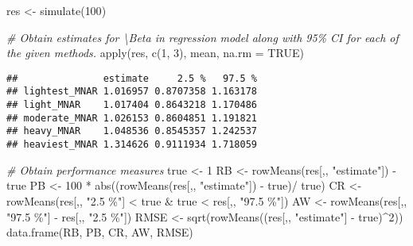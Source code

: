 \documentclass[
]{article}
\newenvironment{Shaded}{\begin{snugshade}}{\end{snugshade}}
\newcommand{\AttributeTok}[1]{\textcolor[rgb]{0.77,0.63,0.00}{#1}}
\newcommand{\CommentTok}[1]{\textcolor[rgb]{0.56,0.35,0.01}{\textit{#1}}}
\newcommand{\ConstantTok}[1]{\textcolor[rgb]{0.00,0.00,0.00}{#1}}
\newcommand{\DecValTok}[1]{\textcolor[rgb]{0.00,0.00,0.81}{#1}}
\newcommand{\FunctionTok}[1]{\textcolor[rgb]{0.00,0.00,0.00}{#1}}
\newcommand{\NormalTok}[1]{#1}
\newcommand{\OtherTok}[1]{\textcolor[rgb]{0.56,0.35,0.01}{#1}}
\newcommand{\SpecialCharTok}[1]{\textcolor[rgb]{0.00,0.00,0.00}{#1}}
\newcommand{\StringTok}[1]{\textcolor[rgb]{0.31,0.60,0.02}{#1}}
\begin{document}
\begin{Shaded}
\begin{Highlighting}[]
\NormalTok{res }\OtherTok{\textless{}{-}} \FunctionTok{simulate}\NormalTok{(}\DecValTok{100}\NormalTok{)}
\end{Highlighting}
\end{Shaded}

\begin{Shaded}
\begin{Highlighting}[]
\CommentTok{\# Obtain estimates for \textbackslash{}Beta in regression model along with 95\% CI for each of the given methods.}
\FunctionTok{apply}\NormalTok{(res, }\FunctionTok{c}\NormalTok{(}\DecValTok{1}\NormalTok{, }\DecValTok{3}\NormalTok{), mean, }\AttributeTok{na.rm =} \ConstantTok{TRUE}\NormalTok{)}
\end{Highlighting}
\end{Shaded}

\begin{verbatim}
##               estimate     2.5 %   97.5 %
## lightest_MNAR 1.016957 0.8707358 1.163178
## light_MNAR    1.017404 0.8643218 1.170486
## moderate_MNAR 1.026153 0.8604851 1.191821
## heavy_MNAR    1.048536 0.8545357 1.242537
## heaviest_MNAR 1.314626 0.9111934 1.718059
\end{verbatim}

\begin{Shaded}
\begin{Highlighting}[]
\CommentTok{\# Obtain performance measures}
\NormalTok{true }\OtherTok{\textless{}{-}} \DecValTok{1}
\NormalTok{RB }\OtherTok{\textless{}{-}} \FunctionTok{rowMeans}\NormalTok{(res[,, }\StringTok{"estimate"}\NormalTok{]) }\SpecialCharTok{{-}}\NormalTok{ true}
\NormalTok{PB }\OtherTok{\textless{}{-}} \DecValTok{100} \SpecialCharTok{*} \FunctionTok{abs}\NormalTok{((}\FunctionTok{rowMeans}\NormalTok{(res[,, }\StringTok{"estimate"}\NormalTok{]) }\SpecialCharTok{{-}}\NormalTok{ true)}\SpecialCharTok{/}\NormalTok{ true)}
\NormalTok{CR }\OtherTok{\textless{}{-}} \FunctionTok{rowMeans}\NormalTok{(res[,, }\StringTok{"2.5 \%"}\NormalTok{] }\SpecialCharTok{\textless{}}\NormalTok{ true }\SpecialCharTok{\&}\NormalTok{ true }\SpecialCharTok{\textless{}}\NormalTok{ res[,, }\StringTok{"97.5 \%"}\NormalTok{])}
\NormalTok{AW }\OtherTok{\textless{}{-}} \FunctionTok{rowMeans}\NormalTok{(res[,, }\StringTok{"97.5 \%"}\NormalTok{] }\SpecialCharTok{{-}}\NormalTok{ res[,, }\StringTok{"2.5 \%"}\NormalTok{])}
\NormalTok{RMSE }\OtherTok{\textless{}{-}} \FunctionTok{sqrt}\NormalTok{(}\FunctionTok{rowMeans}\NormalTok{((res[,, }\StringTok{"estimate"}\NormalTok{] }\SpecialCharTok{{-}}\NormalTok{ true)}\SpecialCharTok{\^{}}\DecValTok{2}\NormalTok{))}
\FunctionTok{data.frame}\NormalTok{(RB, PB, CR, AW, RMSE)}
\end{Highlighting}
\end{Shaded}
\end{document}
